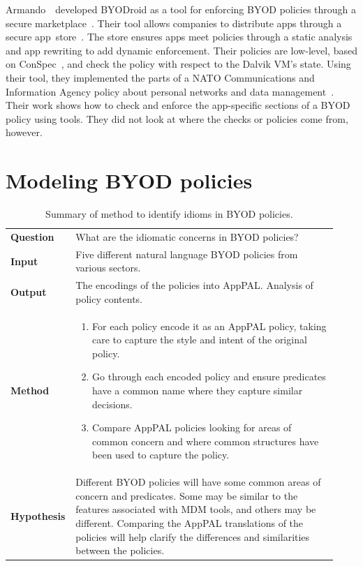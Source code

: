 \documentclass[thesis.tex]{subfiles}
\begin{document}
Armando~\etal~developed BYODroid as a tool for enforcing BYOD policies through a
secure marketplace~\cite{armando_bring_2013}. Their tool allows companies to
distribute apps through a secure app~store~\cite{armando_enabling_2014}. The
store ensures apps meet policies through a static analysis and
app rewriting to add dynamic enforcement. Their policies are low-level, based on
ConSpec~\cite{aktug_conspec_2008}, and check the policy with respect to the Dalvik VM's state.
Using their tool, they implemented the parts of a NATO Communications and
Information Agency policy about personal networks and data
management~\cite{armando_developing_2016}. Their work shows how to check and enforce the app-specific
sections of a BYOD policy using tools. They did not
look at where the checks or policies come from, however.


\section{Modeling BYOD policies}

\begin{table}
  \centering\sffamily\footnotesize
  \begin{tabular}{p{0.14\linewidth}>{\raggedright\arraybackslash}p{0.79\linewidth}}
    \toprule
    \textbf{Question} & What are the idiomatic concerns in BYOD policies? \\
    \textbf{Input} & Five different natural language BYOD policies from various sectors.\\
    \textbf{Output} & The encodings of the policies into AppPAL.  Analysis of policy contents.\\
    \textbf{Method} & 
      \begin{enumerate}
        \item For each policy encode it as an AppPAL policy, taking care to capture the style and intent of the original policy.
        \item Go through each encoded policy and ensure predicates have a common name where they capture similar decisions.
        \item Compare AppPAL policies looking for areas of common concern and where common structures have been used to capture the policy.
      \end{enumerate} \\
    \textbf{Hypothesis} & Different BYOD policies will have some common areas of concern and predicates.  Some may be similar to the features associated with MDM tools, and others may be different.  Comparing the AppPAL translations of the policies will help clarify the differences and similarities between the policies. \\
    \bottomrule
  \end{tabular}
  \caption{Summary of method to identify idioms in BYOD policies.}
  \label{tab:experiment-byod}
\end{table}
\end{document}
